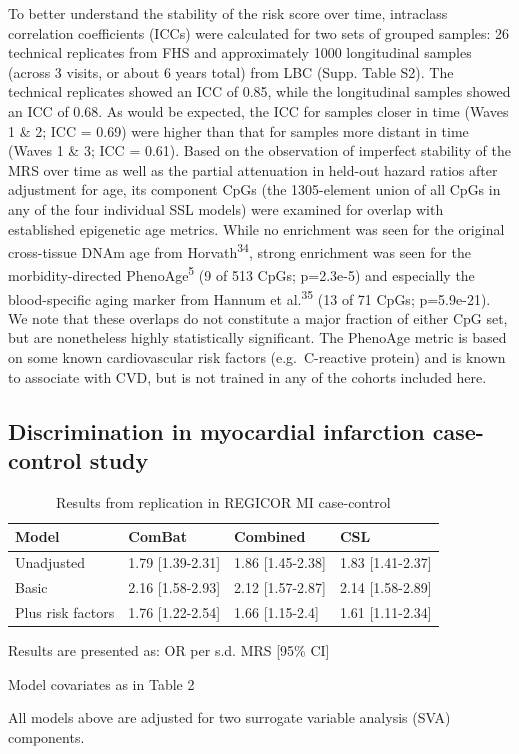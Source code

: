 \documentclass[]{article}
\begin{document}
To better understand the stability of the risk score over time,
intraclass correlation coefficients (ICCs) were calculated for two sets
of grouped samples: 26 technical replicates from FHS and approximately
1000 longitudinal samples (across 3 visits, or about 6 years total) from
LBC (Supp. Table S2). The technical replicates showed an ICC of 0.85,
while the longitudinal samples showed an ICC of 0.68. As would be
expected, the ICC for samples closer in time (Waves 1 \& 2; ICC = 0.69)
were higher than that for samples more distant in time (Waves 1 \& 3;
ICC = 0.61). Based on the observation of imperfect stability of the MRS
over time as well as the partial attenuation in held-out hazard ratios
after adjustment for age, its component CpGs (the 1305-element union of
all CpGs in any of the four individual SSL models) were examined for
overlap with established epigenetic age metrics. While no enrichment was
seen for the original cross-tissue DNAm age from
Horvath\textsuperscript{34}, strong enrichment was seen for the
morbidity-directed PhenoAge\textsuperscript{5} (9 of 513 CpGs; p=2.3e-5)
and especially the blood-specific aging marker from Hannum et
al.\textsuperscript{35} (13 of 71 CpGs; p=5.9e-21). We note that these
overlaps do not constitute a major fraction of either CpG set, but are
nonetheless highly statistically significant. The PhenoAge metric is
based on some known cardiovascular risk factors (e.g.~C-reactive
protein) and is known to associate with CVD, but is not trained in any
of the cohorts included here.

\hypertarget{discrimination-in-myocardial-infarction-case-control-study}{%
\subsection{Discrimination in myocardial infarction case-control
study}\label{discrimination-in-myocardial-infarction-case-control-study}}

\begin{table}

\caption{\label{tab:regicor}Results from replication in REGICOR MI case-control}
\centering
\begin{threeparttable}
\begin{tabular}[t]{llll}
\toprule
Model & ComBat & Combined & CSL\\
\midrule
Unadjusted & 1.79 [1.39-2.31] & 1.86 [1.45-2.38] & 1.83 [1.41-2.37]\\
Basic & 2.16 [1.58-2.93] & 2.12 [1.57-2.87] & 2.14 [1.58-2.89]\\
Plus risk factors & 1.76 [1.22-2.54] & 1.66 [1.15-2.4] & 1.61 [1.11-2.34]\\
\bottomrule
\end{tabular}
\begin{tablenotes}
\item * Results are presented as: OR per s.d. MRS [95\% CI]
\item * Model covariates as in Table 2
\item * All models above are adjusted for two surrogate variable analysis (SVA) components.
\end{tablenotes}
\end{threeparttable}
\end{table}
\end{document}
